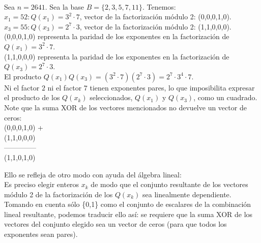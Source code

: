\begin{ejemplo} \, \\
Sea $n=2641$. Sea la base $B = \{ 2,3,5,7,11 \}$. Tenemos: \\
$x_1=52: Q(x_1)=3^2\cdot 7$, vector de la factorización módulo 2: (0,0,0,1,0). \\
$x_3=55: Q(x_3)=2^7\cdot 3$, vector de la factorización módulo 2: (1,1,0,0,0). \\
(0,0,0,1,0) representa la paridad de los exponentes en la factorización de $Q(x_1)=3^2\cdot 7$. \\
(1,1,0,0,0) representa la paridad de los exponentes en la factorización de $Q(x_3)=2^7 \cdot 3$. \\
El producto $Q(x_1)Q(x_3) = (3^2 \cdot 7)(2^7 \cdot 3)=2^7\cdot 3^4 \cdot 7$. \\
Ni el factor $2$ ni el factor $7$ tienen exponentes pares, lo que imposibilita expresar el producto de los $Q(x_k)$ seleccionados, $Q(x_1)$ y $Q(x_3)$, como un cuadrado. \\
Note que la suma XOR de los vectores mencionados no devuelve un vector de ceros: \\
(0,0,0,1,0) + \\
(1,1,0,0,0) \\
-------------- \\
(1,1,0,1,0) \\
\end{ejemplo}

Ello se refleja de otro modo con ayuda del álgebra lineal: \\
Es preciso elegir enteros $x_k$ de modo que el conjunto resultante de los vectores módulo 2 de la factorización de los $Q(x_k)$ sea linealmente dependiente. \\
Tomando en cuenta sólo \{0,1\} como el conjunto de escalares de la combinación lineal resultante, podemos traducir ello así: se requiere que la suma XOR de los vectores del conjunto elegido sea un vector de ceros (para que todos los exponentes sean pares). \\

